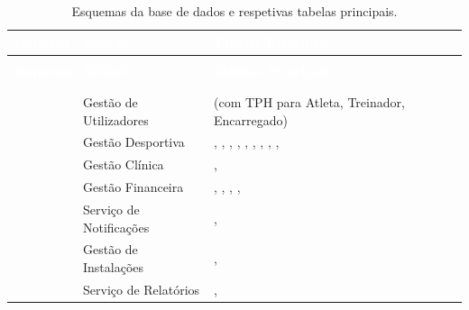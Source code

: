 \begin{center}
{\footnotesize
{}
\begin{xltabular}{\textwidth}{|>{\raggedright\arraybackslash}p{2.5cm}|>{\raggedright\arraybackslash}p{3.5cm}|>{\raggedright\arraybackslash}X|}
\hline
{}\textcolor{white}{\textbf{Esquema}} & \textcolor{white}{\textbf{Módulo}} & \textcolor{white}{\textbf{Tabelas Principais}} \\ \hline
\endfirsthead

 \\
\hline
{}\textcolor{white}{\textbf{Esquema}} & \textcolor{white}{\textbf{Módulo}} & \textcolor{white}{\textbf{Tabelas Principais}} \\ \hline
\endhead

\hline {} \\ \hline \endfoot

\hline
\caption{Esquemas da base de dados e respetivas tabelas principais.}
\label{tab:esquemas-bd} \\
\endlastfoot

         & Gestão de Utilizadores     &  (com TPH para Atleta, Treinador, Encarregado) \\ \hline
{}        & Gestão Desportiva          & , , , , , , , , ,  \\ \hline
{}      & Gestão Clínica             & ,  \\ \hline
{}       & Gestão Financeira          & , , , ,  \\ \hline
{} & Serviço de Notificações    & ,  \\ \hline
{}    & Gestão de Instalações      & ,  \\ \hline
{}       & Serviço de Relatórios      & ,  \\ \hline
\end{xltabular}
}
\end{center}

